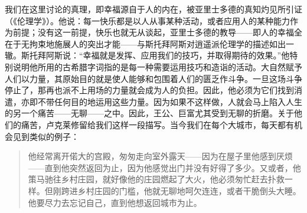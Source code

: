\documentclass[12pt,oneside]{book}
\begin{document}
我们在这里讨论的真理，即幸福源自于人的内在，被亚里士多德的真知灼见所引证（《伦理学》）。他说：每一快乐都是以人从事某种活动，或者应用人的某种能力作为前提；没有这一前提，快乐也就无从谈起，亚里士多德的教导——即人的幸福全在于无拘束地施展人的突出才能——与斯托拜阿斯对逍遥派伦理学的描述如出一辙。斯托拜阿斯说：“幸福就是发挥、应用我们的技巧，并取得期待的效果。”他特别说明他所用的古希腊字词指的是每一种需要运用技巧和造诣的活动。大自然赋予人们以力量，其原始目的就是使人能够和包围着人们的匮乏作斗争。一旦这场斗争停止了，那再也派不上用场的力量就会成为人的负担。因此，他必须为它们找到消遣，亦即不带任何目的地运用这些力量。因为如果不这样做，人就会马上陷入人生的另一个痛苦——无聊——之中。因此，王公、巨富尤其受到无聊的折磨。关于他们的痛苦，卢克莱修留给我们这样一段描写。当今我们在每个大城市，每天都有机会见到类似的例子： 

 
\begin{quotation}
他经常离开偌大的宫殿，匆匆走向室外露天——因为在屋子里他感到厌烦——直到他突然返回为止，因为他感觉出门并没有好得了多少。又或者，他策马驰往乡村庄园，就好像他的庄园燃起了大火，他必须匆忙赶去扑救一样。但刚跨进乡村庄园的门槛，他就无聊地呵欠连连，或者干脆倒头大睡。他要尽力去忘记自己，直到他想返回城市为止。 
\end{quotation}
 
\end{document}
